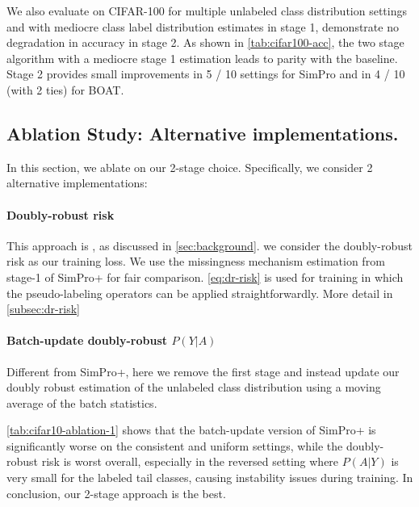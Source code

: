 We also evaluate on CIFAR-100 for multiple unlabeled  class distribution settings and with mediocre class label distribution estimates in stage 1, demonstrate no degradation in accuracy in stage 2. As shown in \cref{tab:cifar100-acc}, the two stage algorithm with a mediocre stage 1 estimation leads to parity with the baseline. Stage 2 provides small improvements in 5 / 10 settings for SimPro and in 4 / 10 (with 2 ties) for BOAT.


\subsection{Ablation Study: Alternative implementations.}
\label{subsec:ablation-1}
In this section, we ablate on our 2-stage choice. Specifically, we consider 2 alternative implementations:
\paragraph{\textbf{Doubly-robust risk}}  
This approach is \cite{arelabelsinformative, onnonrandommissinglabels}, as discussed in \cref{sec:background}. we consider the doubly-robust risk as our training loss. We use the missingness mechanism estimation from stage-1 of SimPro+ for fair comparison. \cref{eq:dr-risk} is used for training in which the pseudo-labeling operators can be applied straightforwardly. More detail in \cref{subsec:dr-risk}
\paragraph{\textbf{Batch-update doubly-robust $P(Y|A)$}} Different from SimPro+, here we remove the first stage and instead update our doubly robust estimation of the unlabeled class distribution using a moving average of the batch statistics.

\cref{tab:cifar10-ablation-1} shows that the batch-update version of SimPro+ is significantly worse on the consistent and uniform settings, while the doubly-robust risk is worst overall, especially in the reversed setting where $P(A|Y)$ is very small for the labeled tail classes, causing instability issues during training. In conclusion, our 2-stage approach is the best.

